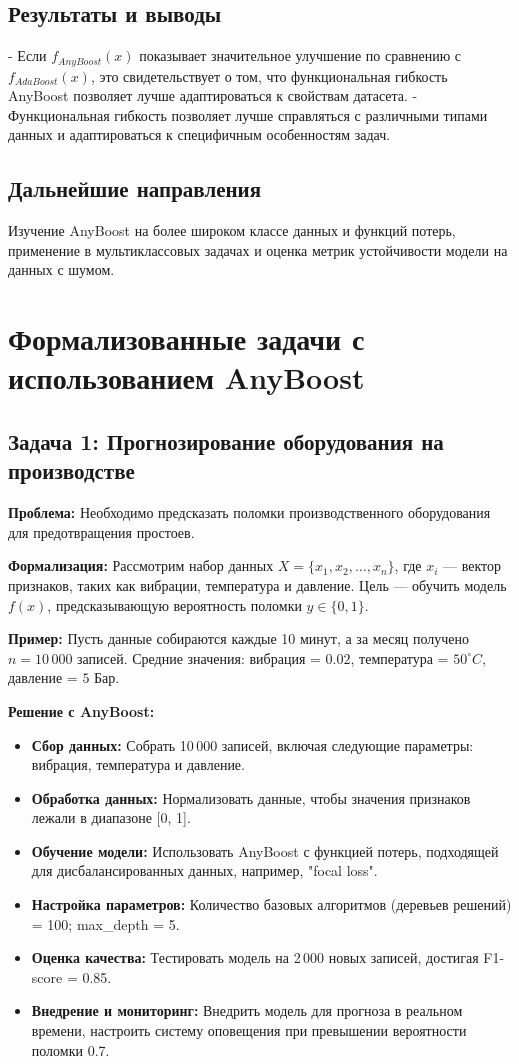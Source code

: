 \subsection*{Результаты и выводы}

- Если $f_{AnyBoost}(x)$ показывает значительное улучшение по сравнению с $f_{AdaBoost}(x)$, это свидетельствует о том, что функциональная гибкость AnyBoost позволяет лучше адаптироваться к свойствам датасета.
- Функциональная гибкость позволяет лучше справляться с различными типами данных и адаптироваться к специфичным особенностям задач.

\subsection*{Дальнейшие направления}
Изучение AnyBoost на более широком классе данных и функций потерь, применение в мультиклассовых задачах и оценка метрик устойчивости модели на данных с шумом.


\section*{Формализованные задачи с использованием AnyBoost}

\subsection*{Задача 1: Прогнозирование оборудования на производстве}

\textbf{Проблема:} Необходимо предсказать поломки производственного оборудования для предотвращения простоев.

\textbf{Формализация:} 
Рассмотрим набор данных $X = \{x_1, x_2, \ldots, x_n\}$, где $x_i$ — вектор признаков, таких как вибрации, температура и давление. Цель — обучить модель $f(x)$, предсказывающую вероятность поломки $y \in \{0, 1\}$.

\textbf{Пример:} 
Пусть данные собираются каждые 10 минут, а за месяц получено $n = 10\,000$ записей. Средние значения: вибрация = $0.02$, температура = $50^\circ C$, давление = $5$ Бар.

\textbf{Решение с AnyBoost:}
\begin{itemize}
    \item \textbf{Сбор данных:} Собрать 10\,000 записей, включая следующие параметры: вибрация, температура и давление.
    \item \textbf{Обработка данных:} Нормализовать данные, чтобы значения признаков лежали в диапазоне [0, 1].
    \item \textbf{Обучение модели:} Использовать AnyBoost с функцией потерь, подходящей для дисбалансированных данных, например, "focal loss".
    \item \textbf{Настройка параметров:} Количество базовых алгоритмов (деревьев решений) = 100; max\_depth = 5.
    \item \textbf{Оценка качества:} Тестировать модель на 2\,000 новых записей, достигая F1-score = 0.85.
    \item \textbf{Внедрение и мониторинг:} Внедрить модель для прогноза в реальном времени, настроить систему оповещения при превышении вероятности поломки 0.7.
\end{itemize}

